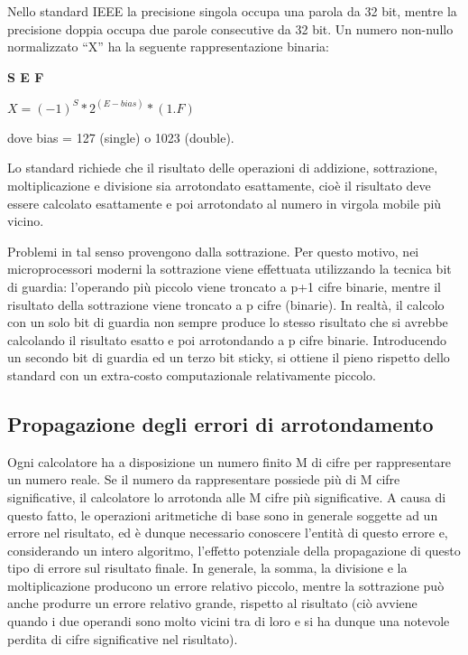 Nello standard IEEE la precisione singola occupa una parola da 32 bit, mentre la precisione doppia occupa due parole consecutive da 32 bit. Un numero non-nullo normalizzato ``X'' ha la seguente rappresentazione binaria:

\begin{center}
	\textbf{S E F}

	$X  =  (-1)^S  *  2^{(E-bias)}  *  (1.F)$
	\end{center}

dove bias = 127 (single) o 1023 (double).

Lo standard richiede che il risultato delle operazioni di addizione, sottrazione, moltiplicazione e divisione sia arrotondato esattamente, cioè il risultato deve essere calcolato esattamente e poi arrotondato al numero in virgola mobile più vicino.

Problemi in tal senso provengono dalla sottrazione. Per questo motivo, nei microprocessori moderni la sottrazione viene effettuata utilizzando la tecnica bit di guardia:  l'operando più piccolo viene troncato a p+1 cifre binarie, mentre il risultato della sottrazione viene troncato a p cifre (binarie). In realtà, il calcolo con un solo bit di guardia non sempre produce lo stesso risultato che si avrebbe calcolando il risultato esatto e poi arrotondando a p cifre binarie. Introducendo un secondo bit di guardia ed un terzo bit sticky, si ottiene il pieno rispetto dello standard con un extra-costo computazionale relativamente piccolo.

\subsection{Propagazione degli errori di arrotondamento}

Ogni calcolatore ha a disposizione un numero finito M di cifre per rappresentare un numero reale. Se il numero da rappresentare possiede più di M cifre significative, il calcolatore lo arrotonda alle M cifre più significative. A causa di questo fatto, le operazioni aritmetiche di base sono in generale soggette ad un errore nel risultato, ed è dunque necessario conoscere l’entità di questo errore e, considerando un intero algoritmo,  l’effetto potenziale della propagazione di questo tipo di errore sul risultato finale.
In generale, la somma, la divisione e la moltiplicazione producono un errore relativo piccolo, mentre la sottrazione può anche produrre un errore relativo grande, rispetto al risultato (ciò avviene quando i due operandi sono molto vicini tra di loro e si ha dunque una notevole perdita di cifre significative nel risultato).

